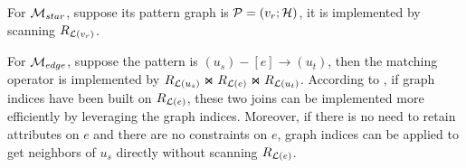 For $\mathcal{M}_{star}$, suppose its pattern graph is $\mathcal{P} = (v_r; \mathcal{H})$, it is implemented by scanning ${R_{\mathcal{L}(v_r)}}$.

For $\mathcal{M}_{edge}$, suppose the pattern is $(u_s) - [e] \rightarrow (u_t)$, then the matching operator is implemented by ${R_{\mathcal{L}(u_s)}} \Join {\ensuremath R_{\mathcal{L}(e)}} \Join {\ensuremath R_{\mathcal{L}(u_t)}}$.
According to , if graph indices have been built on ${R_{\mathcal{L}(e)}}$, these two joins can be implemented more efficiently by leveraging the graph indices.
Moreover, if there is no need to retain attributes on $e$ and there are no constraints on $e$, graph indices can be applied to get neighbors of $u_s$ directly without scanning ${R_{\mathcal{L}(e)}}$.

